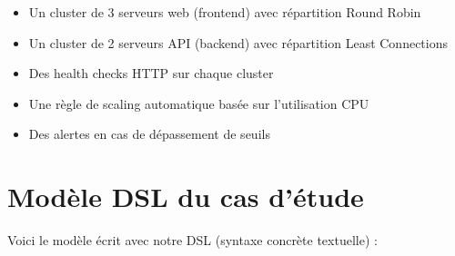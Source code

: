 \documentclass[12pt,a4paper]{report}
\begin{document}
\begin{itemize}
  \item Un cluster de 3 serveurs web (frontend) avec répartition Round Robin
  \item Un cluster de 2 serveurs API (backend) avec répartition Least Connections
  \item Des health checks HTTP sur chaque cluster
  \item Une règle de scaling automatique basée sur l'utilisation CPU
  \item Des alertes en cas de dépassement de seuils
\end{itemize}

\section{Modèle DSL du cas d'étude}

Voici le modèle écrit avec notre DSL (syntaxe concrète textuelle) :
\end{document}
